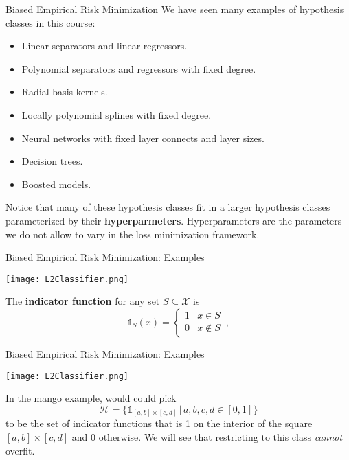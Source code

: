 \documentclass[10pt, table, handout]{beamer}
\begin{document}
\begin{frame}[fragile]{Biased Empirical Risk Minimization}
We have seen many examples of hypothesis classes in this course:

\begin{itemize}
\item Linear separators and linear regressors.\pause
\item Polynomial separators and regressors with fixed degree. \pause
\item Radial basis kernels. \pause
\item Locally polynomial splines with fixed degree. \pause
\item Neural networks with fixed layer connects and layer sizes.\pause
\item Decision trees.\pause
\item Boosted models. \pause
\end{itemize}
Notice that many of these hypothesis classes fit in a larger hypothesis classes parameterized by their \textbf{hyperparmeters}. Hyperparameters are the parameters we do not allow to vary in the loss minimization framework. 
\end{frame}





\begin{frame}[fragile]{Biased Empirical Risk Minimization: Examples}
  \begin{minipage}[t][0.5\textheight][t]{\textwidth}
    \texttt{[image: L2Classifier.png]}
        \centering
  \end{minipage}
  \vfill
  \begin{minipage}[t][0.5\textheight][t]{\textwidth}
The \textbf{indicator function} for any set $S\subseteq \mathcal{X}$ is
$$
\mathds{1}_S(x) = \begin{cases}
1&  x\in S
\\
0 & x\not\in S
\end{cases}\,,
$$
  \end{minipage}
\end{frame}



\begin{frame}[fragile]{Biased Empirical Risk Minimization: Examples}
  \begin{minipage}[t][0.5\textheight][t]{\textwidth}
    \texttt{[image: L2Classifier.png]}
        \centering
  \end{minipage}
  \vfill
  \begin{minipage}[t][0.5\textheight][t]{\textwidth}
In the mango example, would could pick 
$$
\mathcal{H} = \{ \mathds{1}_{[a,b]\times[c,d]}\,|\, a,b,c,d\in [0,1]\}
$$ 
to be the set of indicator functions that is 1 on the interior of the square  $[a,b]\times[c,d]$ and 0 otherwise. We will see that restricting to this class \textit{cannot} overfit.
  \end{minipage}
\end{frame}
\end{document}
